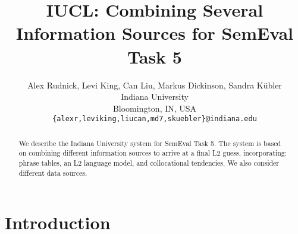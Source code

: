 \documentclass[11pt]{article}
\title{IUCL: Combining Several Information Sources for SemEval Task 5}
\author{Alex Rudnick, Levi King, Can Liu, Markus Dickinson, Sandra K\"ubler  \\
  Indiana University \\
  Bloomington, IN, USA \\
  {\tt \{alexr,leviking,liucan,md7,skuebler\}@indiana.edu} }
\date{}
\begin{document}
\maketitle
\begin{abstract}
  We describe the Indiana University system for SemEval Task 5.
  The system is based on combining different information sources to
  arrive at a final L2 guess, incorporating: phrase tables, an L2
  language model, and collocational tendencies.  We also consider
  different data sources.
 \end{abstract}


\section{Introduction}

\end{document}
